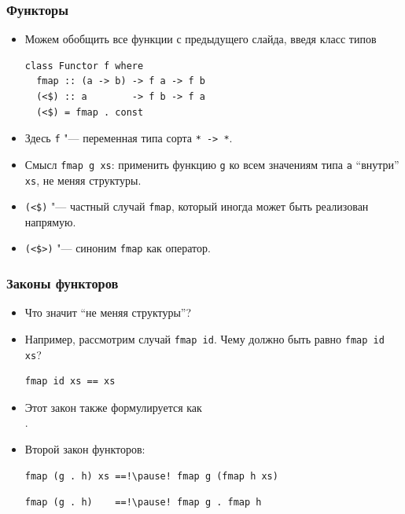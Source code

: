 \documentclass[11pt]{beamer}
\begin{document}
\begin{frame}[fragile]
  \frametitle{Функторы}
  \begin{itemize}
    \item Можем обобщить все функции с предыдущего слайда, введя класс типов
          \begin{lstlisting}
class Functor f where
  fmap :: (a -> b) -> f a -> f b
  (<$) :: a        -> f b -> f a
  (<$) = fmap . const
\end{lstlisting}
    \item Здесь \lstinline|f| "--- переменная типа сорта \pause \lstinline|* -> *|.
    \item Смысл \lstinline|fmap g xs|: применить функцию \lstinline|g| ко всем значениям типа \lstinline|a| \enquote{внутри} \lstinline|xs|, не меняя структуры.
    \item \lstinline|(<$)| "--- частный случай \lstinline|fmap|, который иногда может быть реализован напрямую.
          \pause
    \item \lstinline|(<$>)| "--- синоним \lstinline|fmap| как оператор.
  \end{itemize}
\end{frame}

\begin{frame}[fragile]
  \frametitle{Законы функторов}
  \begin{itemize}
    \item Что значит \enquote{не меняя структуры}?
    \item Например, рассмотрим случай \lstinline|fmap id|. Чему должно быть равно \lstinline|fmap id xs|? \pause
          \begin{lstlisting}
fmap id xs == xs
\end{lstlisting}
          \pause
    \item Этот закон также формулируется как \\ . \pause
    \item Второй закон функторов:
          \begin{lstlisting}
fmap (g . h) xs ==!\pause! fmap g (fmap h xs)
\end{lstlisting}
          \pause
          \begin{lstlisting}
fmap (g . h)    ==!\pause! fmap g . fmap h
\end{lstlisting}
  \end{itemize}
\end{frame}
\end{document}
